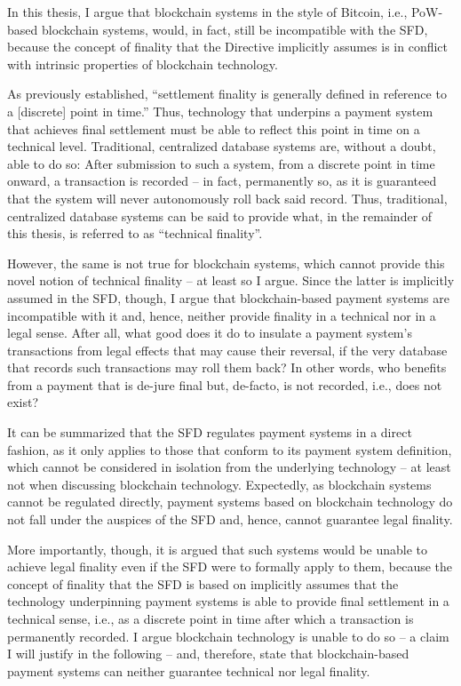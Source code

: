 In this thesis, I argue that blockchain systems in the style of Bitcoin, i.e., PoW-based blockchain systems, would, in fact, still be incompatible with the SFD, because the concept of finality that the Directive implicitly assumes is in conflict with intrinsic properties of blockchain technology.

As previously established, ``settlement finality is generally defined in reference to a [discrete] point in time.'' \autocite{liao2017}
Thus, technology that underpins a payment system that achieves final settlement must be able to reflect this point in time on a technical level.
Traditional, centralized database systems are, without a doubt, able to do so:
After submission to such a system, from a discrete point in time onward, a transaction is recorded -- in fact, permanently so, as it is guaranteed that the system will never autonomously roll back said record.
Thus, traditional, centralized database systems can be said to provide what, in the remainder of this thesis, is referred to as ``technical finality''.

However, the same is not true for blockchain systems, which cannot provide this novel notion of technical finality -- at least so I argue.
Since the latter is implicitly assumed in the SFD, though, I argue that blockchain-based payment systems are incompatible with it and, hence, neither provide finality in a technical nor in a legal sense. After all, what good does it do to insulate a payment system's transactions from legal effects that may cause their reversal, if the very database that records such transactions may roll them back?
In other words, who benefits from a payment that is de-jure final but, de-facto, is not recorded, i.e., does not exist?

It can be summarized that the SFD regulates payment systems in a direct fashion, as it only applies to those that conform to its payment system definition, which cannot be considered in isolation from the underlying technology -- at least not when discussing blockchain technology.
Expectedly, as blockchain systems cannot be regulated directly, payment systems based on blockchain technology do not fall under the auspices of the SFD and, hence, cannot guarantee legal finality.

More importantly, though, it is argued that such systems would be unable to achieve legal finality even if the SFD were to formally apply to them, because the concept of finality that the SFD is based on implicitly assumes that the technology underpinning payment systems is able to provide final settlement in a technical sense, i.e., as a discrete point in time after which a transaction is permanently recorded.
I argue blockchain technology is unable to do so -- a claim I will justify in the following -- and, therefore, state that blockchain-based payment systems can neither guarantee technical nor legal finality.
